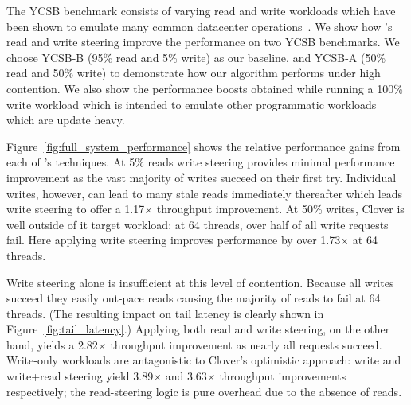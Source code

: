 The YCSB benchmark consists of varying read and write workloads which
have been shown to emulate many common datacenter
operations~\cite{ycsb}. We show how \sword's read and write steering
improve the
performance on two
YCSB benchmarks. We choose YCSB-B (95\% read and 5\% write) as our baseline, and
YCSB-A (50\% read and 50\% write) to demonstrate how our algorithm performs
under high contention.  We also show the performance boosts obtained while
running a 100\% write workload which is intended to emulate other programmatic
workloads which are update heavy.

Figure~\ref{fig:full_system_performance} shows the relative
performance gains from each of \sword's techniques. At 5\% reads write
steering provides minimal performance improvement as the vast majority
of writes succeed on their first try. Individual writes, however, can
lead to many stale reads immediately thereafter which leads write steering
to offer a 1.17$\times$ throughput improvement.
%
%
At 50\% writes, Clover is well outside of it target workload:
at 64 threads, over half of all write requests fail. Here applying write
steering improves performance by over 1.73$\times$ at 64 threads.

Write steering alone is insufficient at this level of contention.
Because all writes succeed they easily out-pace reads causing the
majority of reads to fail at 64 threads.  (The resulting impact on
tail latency is clearly shown in Figure~\ref{fig:tail_latency}.)
Applying both read and write steering, on the other hand, yields a
2.82$\times$ throughput improvement as nearly all requests succeed.
%
%
Write-only workloads are antagonistic to Clover's optimistic
approach: write and write+read steering yield 3.89$\times$ and
3.63$\times$ throughput improvements respectively; the read-steering
logic is pure overhead due to the absence of reads.






